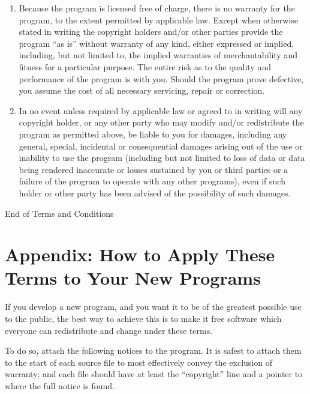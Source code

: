 \documentclass[a4paper,11pt]{book}
\begin{document}
\begin{enumerate}
	\begin{center}
		{\Large\sc
			No Warranty
		}
	\end{center}
	
	\item
	{\sc Because the program is licensed free of charge, there is no warranty
		for the program, to the extent permitted by applicable law.  Except when
		otherwise stated in writing the copyright holders and/or other parties
		provide the program ``as is'' without warranty of any kind, either expressed
		or implied, including, but not limited to, the implied warranties of
		merchantability and fitness for a particular purpose.  The entire risk as
		to the quality and performance of the program is with you.  Should the
		program prove defective, you assume the cost of all necessary servicing,
		repair or correction.}
	
	\item
	{\sc In no event unless required by applicable law or agreed to in writing
		will any copyright holder, or any other party who may modify and/or
		redistribute the program as permitted above, be liable to you for damages,
		including any general, special, incidental or consequential damages arising
		out of the use or inability to use the program (including but not limited
		to loss of data or data being rendered inaccurate or losses sustained by
		you or third parties or a failure of the program to operate with any other
		programs), even if such holder or other party has been advised of the
		possibility of such damages.}
	
\end{enumerate}


\begin{center}
	{\Large\sc End of Terms and Conditions}
\end{center}


\pagebreak[2]

\section*{Appendix: How to Apply These Terms to Your New Programs}

If you develop a new program, and you want it to be of the greatest
possible use to the public, the best way to achieve this is to make it
free software which everyone can redistribute and change under these
terms.

To do so, attach the following notices to the program.  It is safest to
attach them to the start of each source file to most effectively convey
the exclusion of warranty; and each file should have at least the
``copyright'' line and a pointer to where the full notice is found.
\end{document}
